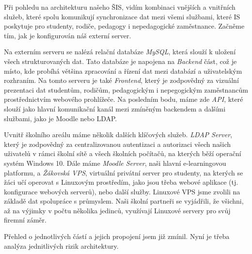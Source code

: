 \documentclass[FM,Proj]{tulthesis}
\begin{document}



Při pohledu na architekturu našeho ŠIS, vidím kombinaci vnějších a vnitřních služeb,
které spolu komunikují synchronizace dat mezi všemi službami, které IS poskytuje pro studenty,
rodiče, pedagogy i nepedagogické zaměstnance. Začněme tím, jak je konfigurován náš externí server.

Na externím serveru se nalézá relační databáze \textit{MySQL}, která slouží k uložení všech  
strukturovaných dat. Tato databáze je napojena na \textit{Backend} část, což je místo, kde probíhá
většina zpracování a řízení dat mezi databází a uživatelským rozhraním. Na tomto serveru je také
\textit{Frontend}, který je zodpovědný za vizuální prezentaci dat studentům, rodičům, pedagogickým i
nepegogickým zaměstnancům prostřednictvím webového prohlížeče. Na posledním bodu, máme zde \textit{API},
které slouží jako hlavní komunikační kanál mezi zmíněným backendem a dalšími službami,
jako je Moodle nebo LDAP.

Uvnitř školního areálu máme několik dalších klíčových služeb. \textit{LDAP Server}, který je
zodpovědný za centralizovanou autentizaci a autorizaci všech našich uživatelů v rámci školní
sítě a všech školních počítačů, na kterých běží operační systém Windows 10. Dále máme \textit{Moodle Server},
naši hlavní e-learningovou platformu, a \textit{Žákovská VPS}, 
virtuální privátní server pro studenty, na kterých se žáci učí operovat s Linuxovým prostředím,
jako jsou třeba webové aplikace (tj. konfigurace webových serverů), nebo další služby.
Linuxové VPS jsme zvolili na základě dat spolupráce s průmyslem. Naši školní partneři se vyjádřili,
že všichni, až na výjimky v počtu několika jedinců, využívají Linuxové servery pro svůj firemní záměr. 

Přehled o jednotlivých částí a jejich propojení jsem již zmínil. Nyní je třeba analýza jednitlivých rizik architektury.
\end{document}
